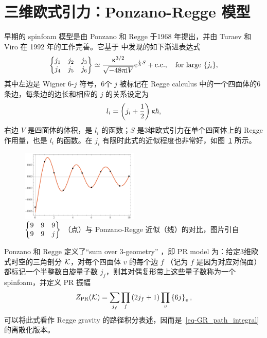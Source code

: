 	\section{三维欧式引力：Ponzano-Regge 模型}

		早期的 spinfoam 模型是由 Ponzano 和 Regge 于1968 年提出\cite{Regge1968}，并由 Turaev 和 Viro 在 1992 年的工作完善\cite{Turaev1992}。它基于 \cite{Regge1968} 中发现的如下渐进表达式
		\begin{equation}
			\left\{ \mqty{j_1&j_2&j_3\\j_4&j_5&j_6} \right\} \simeq \frac{\gkappa^{3/2}}{\sqrt{-48\uppi \ii V}} \e{\frac{\ii}{\hbar} S} + \text{c.c.} \qc \text{for large $\left\{ j_i\right\}$},
		\end{equation}
		其中左边是 Wigner 6-$j$ 符号，6个 $j$ 被标记在 Regge calculus 中的一个四面体的6条边，每条边的边长和相应的 $j$ 的关系设定为
		\begin{equation}
			l_i = \left( j_i + \frac{1}{2} \right) \upkappa \hbar,
		\end{equation}
		右边 $V$ 是四面体的体积，是 $l_i$ 的函数；$S$ 是3维欧式引力在单个四面体上的 Regge 作用量，也是 $l_i$ 的函数。在 $j_i$ 有限时此式的近似程度也非常好，如图~\ref{pic-PR_approx} 所示。
		\begin{figure}[htbp!]
			\centering
			\includegraphics[width=0.5\textwidth]{figures/PRapproximate.png}
			\caption[Ponzano-Regge 近似]{$\left\{ \mqty{9&9&9\\9&9&j} \right\}$ （点）与 Ponzano-Regge 近似（线）的对比，图片引自\cite{Bianchi2017}}\label{pic-PR_approx}
		\end{figure}

		Ponzano 和 Regge 定义了“sum over 3-geometry” ，即 PR model 为：给定3维欧式时空的三角剖分 $\mathcal{K}$，对每个四面体 $v$ 的每个边 $f$ （记为 $f$ 是因为对应对偶面）都标记一个半整数自旋量子数 $j_f$，则其对偶复形带上这些量子数称为一个 spinfoam，并定义 PR 振幅
		\begin{equation}
			Z_{\text{PR}}(\mathcal{K}) = \sum_{j_f} \prod_{f} \left( 2j_f + 1 \right) \prod_{v} \left\{ 6j\right\}_v,
		\end{equation}
		可以将此式看作 Regge gravity 的路径积分表述，因而是~\eqref{eq-GR_path_integral} 的离散化版本。

